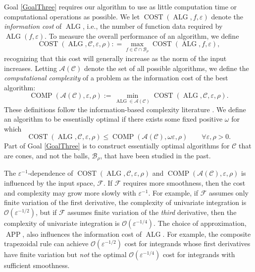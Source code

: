 \documentclass[11pt]{NSFamsart}
\DeclareMathOperator{\cost}{COST}
\DeclareMathOperator{\comp}{COMP}
\DeclareMathOperator{\APP}{APP}
\DeclareMathOperator{\ALG}{ALG}
\newcommand{\cc}{\mathcal{C}}
\newcommand{\cb}{\mathcal{B}}
\newcommand{\cala}{{\mathcal{A}}}
\newcommand{\calc}{{\mathcal{C}}}
\newcommand{\calf}{{\mathcal{F}}}
\newcommand{\Order}{\mathcal{O}}
\begin{document}
Goal \ref{GoalThree} requires our algorithm to use as little computation time or computational operations as possible.  We let $\cost(\ALG, f,\varepsilon)$ denote the \emph{information cost} of $\ALG$, i.e., the number of function data required by $\ALG(f,\varepsilon)$. To measure the overall performance of an algorithm, we define 
\begin{equation*}
    \cost(\ALG, \calc, \varepsilon,\rho) : = \max_{f \in \calc \cap \cb_{\rho}} \cost(\ALG,f,\varepsilon),
\end{equation*}
recognizing that this cost will generally increase as the norm of the input increases. Letting $\cala(\cc)$ denote the set of all possible algorithms, we define the \emph{computational complexity} of a problem as the information cost of the best algorithm:
\begin{equation*}
    \comp(\cala(\cc), \varepsilon,\rho) := \min_{\ALG \in \cala(\cc)} \cost(\ALG, \calc, \varepsilon,\rho) .
\end{equation*}
These definitions follow the information-based complexity literature \cite{TraWer98, TraWasWoz88}.
We define an algorithm to be essentially optimal if there exists some fixed positive $\omega$ for which
\begin{equation*}
    \cost(\ALG, \calc, \varepsilon,\rho) \le \comp(\cala(\cc), \omega \varepsilon,\rho) \qquad \forall \varepsilon,\rho > 0.
\end{equation*}
Part of Goal \ref{GoalThree} is to construct essentially optimal algorithms for $\calc$ that are cones, and not the balls, $\cb_{\rho}$, that have been studied in the past.

The $\varepsilon^{-1}$-dependence of $\cost(\ALG, \calc, \varepsilon,\rho)$ and $\comp(\cala(\cc), \varepsilon,\rho)$ is influenced by the input space, $\calf$.  If $\calf$ requires more smoothness, then the cost and complexity may grow more slowly with $\varepsilon^{-1}$.  For example, if $\calf$  assumes only finite variation of the first derivative, the complexity of univariate integration is $\Order(\varepsilon^{-1/2})$, but if $\calf$ assumes finite variation of the \emph{third} derivative, then the complexity of univariate integration is $\Order(\varepsilon^{-1/4})$.  The choice of approximation, $\APP$, also influences the information cost of $\ALG$.  For example, the composite trapezoidal rule can achieve $\Order(\varepsilon^{-1/2})$ cost for integrands whose first derivatives have finite variation but \emph{not} the optimal $\Order(\varepsilon^{-1/4})$ cost for integrands with sufficient smoothness.
\end{document}
